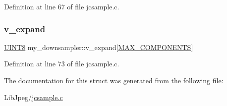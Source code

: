 Definition at line 67 of file jcsample.\+c.

\mbox{\label{structmy__downsampler_ab3bc55e23e197c2129ae09c82fb62e83}} 
\subsubsection{\texorpdfstring{v\_expand}{v\_expand}}
{\footnotesize\ttfamily \mbox{\hyperlink{jmorecfg_8h_adfb9a8ea1dd59f151065f763e1e9acd6}{U\+I\+N\+T8}} my\+\_\+downsampler\+::v\+\_\+expand\mbox{[}\mbox{\hyperlink{jmorecfg_8h_a6d8c910a1fdb6d4762a05f7250e64322}{M\+A\+X\+\_\+\+C\+O\+M\+P\+O\+N\+E\+N\+TS}}\mbox{]}}



Definition at line 73 of file jcsample.\+c.



The documentation for this struct was generated from the following file\+:\begin{DoxyCompactItemize}
\item 
Lib\+Jpeg/\mbox{\hyperlink{jcsample_8c}{jcsample.\+c}}\end{DoxyCompactItemize}
